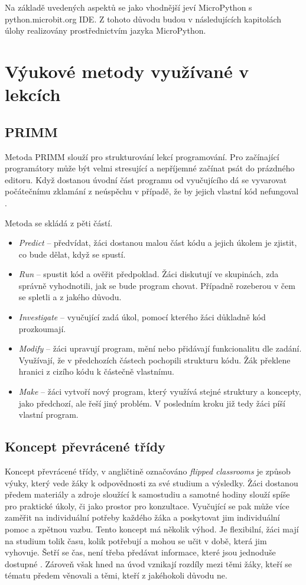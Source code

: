 \documentclass[
  digital,     %
  oneside,     %
  nosansbold,  %
  colorbold, %
  lof,         %
  nolot,         %
]{fithesis4}
\begin{document}
Na základě uvedených aspektů se jako vhodnější jeví MicroPython s python.microbit.org IDE. Z tohoto důvodu budou v následujících kapitolách úlohy realizovány prostřednictvím jazyka MicroPython. 

\chapter{Výukové metody využívané v lekcích}

\section{PRIMM}
Metoda PRIMM slouží pro strukturování lekcí programování. Pro začínající programátory může být velmi stresující a nepříjemné začínat psát do prázdného editoru. Když dostanou úvodní část programu od vyučujícího dá se vyvarovat počátečnímu zklamání z neúspěchu v případě, že by jejich vlastní kód nefungoval \cite{hw}.

Metoda se skládá z pěti částí. 
\begin{itemize}
\item \textit{Predict} -- předvídat, žáci dostanou malou část kódu a jejich úkolem je zjistit, co bude dělat, když se spustí. 
\item \textit{Run} -- spustit kód a ověřit předpoklad. Žáci diskutují ve skupinách, zda správně vyhodnotili, jak se bude program chovat. Případně rozeberou v čem se spletli a z jakého důvodu. 
\item \textit{Investigate} -- vyučující zadá úkol, pomocí kterého žáci důkladně kód prozkoumají. 
\item \textit{Modify} -- žáci upravují program, mění nebo přidávají funkcionalitu dle zadání. Využívají, že v předchozích částech pochopili strukturu kódu. Žák překlene hranici z cizího kódu k částečně vlastnímu. 
\item \textit{Make} -- žáci vytvoří nový program, který využívá stejné struktury a koncepty, jako předchozí, ale řeší jiný problém. V posledním kroku již tedy žáci píší vlastní program.
\end{itemize}

\section{Koncept převrácené třídy}
Koncept převrácené třídy, v angličtině označováno \textit{flipped classrooms} je způsob výuky, který vede žáky k odpovědnosti za své studium a výsledky. 
Žáci dostanou předem materiály a zdroje sloužící k samostudiu a samotné hodiny slouží spíše pro praktické úkoly, či jako prostor pro konzultace. Vyučující se pak může více zaměřit na individuální potřeby každého žáka a poskytovat jim individuální pomoc a zpětnou vazbu.
Tento koncept má několik výhod. Je flexibilní, žáci mají na studium tolik času, kolik potřebují a mohou se učit v době, která jim vyhovuje. Šetří se čas, není třeba předávat informace, které jsou jednoduše dostupné \cite{mazur09}. Zároveň však hned na úvod vznikají rozdíly mezi těmi žáky, kteří se tématu předem věnovali a těmi, kteří z jakéhokoli důvodu ne.
\end{document}
